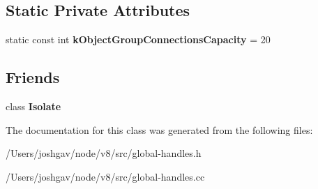 \subsection*{Static Private Attributes}
\begin{DoxyCompactItemize}
\item 
static const int {\bfseries k\+Object\+Group\+Connections\+Capacity} = 20\hypertarget{classv8_1_1internal_1_1_global_handles_ad772988629656831ad6f0e420aed4547}{}\label{classv8_1_1internal_1_1_global_handles_ad772988629656831ad6f0e420aed4547}

\end{DoxyCompactItemize}
\subsection*{Friends}
\begin{DoxyCompactItemize}
\item 
class {\bfseries Isolate}\hypertarget{classv8_1_1internal_1_1_global_handles_aba4f0964bdacf2bbf62cf876e5d28d0a}{}\label{classv8_1_1internal_1_1_global_handles_aba4f0964bdacf2bbf62cf876e5d28d0a}

\end{DoxyCompactItemize}


The documentation for this class was generated from the following files\+:\begin{DoxyCompactItemize}
\item 
/\+Users/joshgav/node/v8/src/global-\/handles.\+h\item 
/\+Users/joshgav/node/v8/src/global-\/handles.\+cc\end{DoxyCompactItemize}
